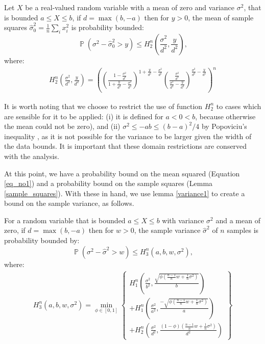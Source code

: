 \documentclass[runningheads, envcountsame, a4paper]{llncs}
\DeclareMathOperator{\p}{\mathbb{P}}
\begin{document}
\begin{lemma}\label{sample_squares}
Let $X$ be a real-valued random variable with a mean of zero and variance $\sigma^2$, that is bounded $a\le X\le b$, if $d=\max(b,-a)$ then for $y>0$, the mean of sample squares $\hat{\sigma}_0^2=\frac{1}{n}\sum_ix_i^2$ is probability bounded:
\begin{equation}\label{equation_squares}\p(\sigma^2 - \hat{\sigma}_0^2> y) \le H_2^n\left(\frac{\sigma^2}{d^2},\frac{y}{d^2}\right),
\end{equation}
where:
\begin{align*} H_2^n\left(\frac{\sigma^2}{d^2},\frac{y}{d^2}\right) = \left(
\left(\frac{1-\frac{\sigma^2}{d^2}}{1+\frac{y}{d^2}-\frac{\sigma^2}{d^2}}\right)^{1+\frac{y}{d^2}-\frac{\sigma^2}{d^2}}
\left(\frac{\frac{\sigma^2}{d^2}}{\frac{\sigma^2}{d^2}-\frac{y}{d^2}}\right)^{\frac{\sigma^2}{d^2}-\frac{y}{d^2}}
\right)^n
\end{align*}
\end{lemma}


It is worth noting that we choose to restrict the use of function $H_2^n$ to cases which are sensible for it to be applied:
(i) it is defined for $a<0<b$, because otherwise the mean could not be zero), and (ii) $\sigma^2\le-ab\le (b-a)^2/4$ by Popoviciu's inequality \cite{zbMATH05780164}, as it is not possible for the variance to be larger given the width of the data bounds.  
It is important that these domain restrictions are conserved with the analysis.

At this point, we have a probability bound on the mean squared (Equation \ref{eq_no1}) 
and a probability bound on the sample squares (Lemma \ref{sample_squares}). With these in hand, we use lemma \ref{variance1} to create a bound on the sample variance, as follows.

\begin{lemma}\label{variance2}
For a random variable that is bounded $a\le X\le b$ with variance $\sigma^2$ and a mean of zero, if $d=\max(b,-a)$ then for $w>0$, the sample variance $\hat{\sigma}^2$ of $n$ samples is probability bounded by:
\begin{equation}\label{eq_no8}
\p(\sigma^2 - \hat{\sigma}^2 > w) \le H_3^n(a,b,w,\sigma^2),
\end{equation}
where:
\begin{align*} H_3^n(a,b,w,\sigma^2) =\min_{\phi\in[0,1]}
\begin{Bmatrix}
	H_1^n\left(\frac{\sigma^2}{b^2},\frac{\sqrt{\phi(\frac{n-1}{n}w+\frac{1}{n}\sigma^2)}}{b}\right)\\
	+H_1^n\left(\frac{\sigma^2}{a^2},\frac{-\sqrt{\phi(\frac{n-1}{n}w+\frac{1}{n}\sigma^2)}}{a}\right)\\
	+H_2^n\left(\frac{\sigma^2}{d^2},\frac{(1-\phi)(\frac{n-1}{n}w+\frac{1}{n}\sigma^2)}{d^2}\right)
\end{Bmatrix}\end{align*}
\end{lemma}
\end{document}
